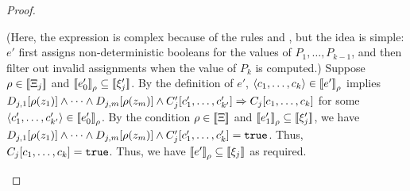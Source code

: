 \begin{proof}
\begin{itemize}
(Here, the expression is complex because of the rules  and ,
but the idea is simple:
\(e'\) first assigns non-deterministic booleans for the values of \(P_1,\ldots,P_{k-1}\),
and then filter out invalid assignments when the value of \(P_k\) is computed.)
Suppose \(\rho\in \mathbin{[\![}\Xi_j\mathbin{]\!]}\) and \(\mathbin{[\![}e_0'\mathbin{]\!]}_{\rho}\subseteq \mathbin{[\![}\xi_j'\mathbin{]\!]}\).
By the definition of \(e'\),
\(\langle{c_1,\ldots,c_k}\rangle\in \mathbin{[\![}e'\mathbin{]\!]}_{\rho}\) implies 
\(D_{j,1}[\rho(z_1)]\land \cdots \land D_{j,m}[\rho(z_m)]\land C_j'[c'_1,\ldots,c'_{k'}]\Rightarrow C_j[c_1,\ldots,c_k]\)
for some \(\langle{c_1',\ldots,c'_{k'}}\rangle\in \mathbin{[\![}e_0'\mathbin{]\!]}_{\rho}\).
By the condition \(\rho\in\mathbin{[\![}\Xi\mathbin{]\!]}\) and \(\mathbin{[\![}e_1'\mathbin{]\!]}_{\rho}\subseteq \mathbin{[\![}\xi_j'\mathbin{]\!]}\),
we have \(D_{j,1}[\rho(z_1)]\land \cdots \land D_{j,m}[\rho(z_m)]\land C_j'[c'_1,\ldots,c'_k]=\mathtt{true}\).
Thus, 
\(C_j[c_1,\ldots,c_k]=\mathtt{true}\).
Thus, we have \(\mathbin{[\![}e'\mathbin{]\!]}_{\rho}\subseteq \mathbin{[\![}\xi_j\mathbin{]\!]}\) as required.


\end{itemize}
\end{proof}
